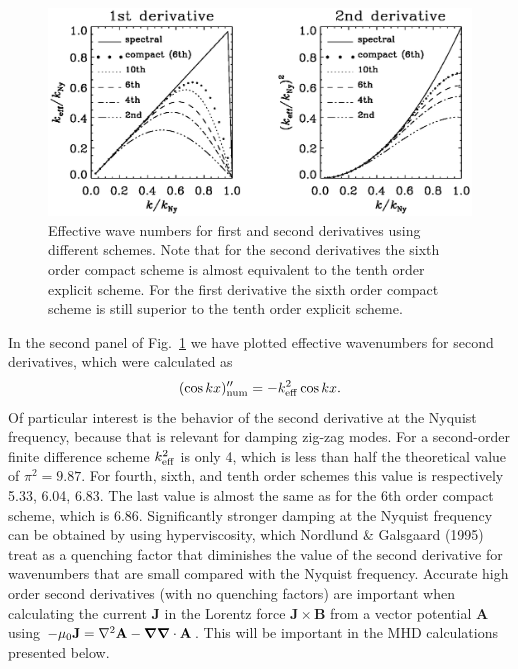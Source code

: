 \documentclass[\mydriver,12pt,twoside,notitlepage,a4paper]{article}
\newcommand{\vekt}[1] {\mathbf{#1}}
\newcommand{\Av}            {\vekt{A}}
\newcommand{\Bv}            {\vekt{B}}
\newcommand{\Jv}            {\vekt{J}}
\newcommand{\nab}{\mbox{\boldmath $\nabla$} {}}
\begin{document}
\begin{figure}[h!]\begin{center}\includegraphics[width=.99\textwidth]
{pkeff}\end{center}\caption[]{
Effective wave numbers for first and second derivatives using different
schemes. Note that for the second derivatives the sixth order compact
scheme is almost equivalent to the tenth order explicit scheme. For the
first derivative the sixth order compact scheme is still superior to the
tenth order explicit scheme.
}\label{Fpkeff}\end{figure}

In the second panel of Fig.~\ref{Fpkeff} we have plotted effective
wavenumbers for second derivatives, which were calculated as
\begin{equation}
(\cos kx)''_{\rm num}=-k_{\rm eff}^2\cos kx.
\end{equation}
Of particular interest is the behavior of the second derivative at the
Nyquist frequency, because that is relevant for damping zig-zag modes.
For a second-order finite difference scheme $k_{\rm eff}^2$ is only 4,
which is less than half the theoretical value of $\pi^2=9.87$. For fourth,
sixth, and tenth order schemes this value is respectively 5.33, 6.04,
6.83. The last value is almost the same as for the 6th order compact
scheme, which is 6.86. Significantly stronger damping at the Nyquist
frequency can be obtained by using hyperviscosity, which Nordlund \&
Galsgaard (1995) treat as a quenching factor that diminishes the value
of the second derivative for wavenumbers that are small compared with
the Nyquist frequency. Accurate high order second derivatives (with no
quenching factors) are important when calculating the current $\Jv$ in
the Lorentz force $\Jv\times\Bv$ from a vector potential $\Av$ using
$-\mu_0\Jv=\nabla^2\Av-\nab\nab\cdot\Av$. This will be important in
the MHD calculations presented below.
\end{document}
